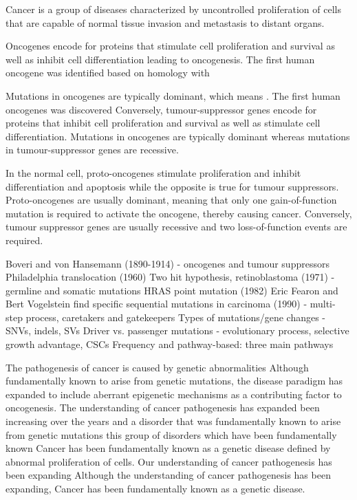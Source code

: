 Cancer is a group of diseases characterized by uncontrolled proliferation of cells that are capable of normal tissue invasion and metastasis to distant organs.

Oncogenes encode for proteins that stimulate cell proliferation and survival as well as inhibit cell differentiation leading to oncogenesis. The first human oncogene was identified based on homology with

Mutations in oncogenes are typically dominant, which means . The first human oncogenes was discovered Conversely, tumour-suppressor genes encode for proteins that inhibit cell proliferation and survival as well as stimulate cell differentiation. Mutations in oncogenes are typically dominant whereas mutations in tumour-suppressor genes are recessive.

In the normal cell, proto-oncogenes stimulate proliferation and inhibit differentiation and apoptosis while the opposite is true for tumour suppressors. Proto-oncogenes are usually dominant, meaning that only one gain-of-function mutation is required to activate the oncogene, thereby causing cancer. Conversely, tumour suppressor genes are usually recessive and two loss-of-function events are required.

Boveri and von Hansemann (1890-1914) - oncogenes and tumour suppressors
Philadelphia translocation (1960)
Two hit hypothesis, retinoblastoma (1971) - germline and somatic mutations
HRAS point mutation (1982)
Eric Fearon and Bert Vogelstein find specific sequential mutations in carcinoma (1990) - multi-step process, caretakers and gatekeepers
Types of mutations/gene changes - SNVs, indels, SVs
Driver vs. passenger mutations - evolutionary process, selective growth advantage, CSCs
Frequency and pathway-based: three main pathways

The pathogenesis of cancer is caused by genetic abnormalities
Although fundamentally known to arise from genetic mutations, the disease paradigm has expanded to include aberrant epigenetic mechanisms as a contributing factor to oncogenesis.
The understanding of cancer pathogenesis has expanded been increasing over the years and a disorder that was fundamentally known to arise from genetic mutations this group of disorders which have been fundamentally known Cancer has been fundamentally known as a genetic disease defined by abnormal proliferation of cells.
Our understanding of cancer pathogenesis has been expanding  Although the understanding of cancer pathogenesis has been expanding, Cancer has been fundamentally known as a genetic disease.
